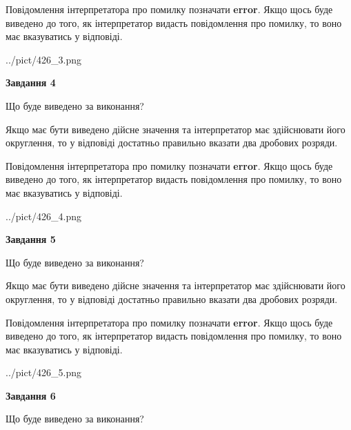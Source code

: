 \documentclass[12pt, ukrainian]{article}
\begin{document}
{\begin {Large}
Повідомлення інтерпретатора про помилку позначати \textbf{error}.
Якщо щось буде виведено до того, як інтерпретатор видасть повідомлення про помилку, 
то воно має вказуватись у відповіді. \par

\begin{center}
	{../pict/426_3.png}
\end{center}
\newpage

{\begin {center}\textbf{Завдання 4}\end {center}}\par
Що буде виведено за виконання? \par

Якщо має бути виведено дійсне значення та інтерпретатор має здійснювати його округлення, 
то у відповіді достатньо правильно вказати два дробових розряди.

Повідомлення інтерпретатора про помилку позначати \textbf{error}.
Якщо щось буде виведено до того, як інтерпретатор видасть повідомлення про помилку, 
то воно має вказуватись у відповіді. \par

\begin{center}
	{../pict/426_4.png}
\end{center}
\newpage

{\begin {center}\textbf{Завдання 5}\end {center}}\par
Що буде виведено за виконання? \par

Якщо має бути виведено дійсне значення та інтерпретатор має здійснювати його округлення, 
то у відповіді достатньо правильно вказати два дробових розряди.

Повідомлення інтерпретатора про помилку позначати \textbf{error}.
Якщо щось буде виведено до того, як інтерпретатор видасть повідомлення про помилку, 
то воно має вказуватись у відповіді. \par

\begin{center}
	{../pict/426_5.png}
\end{center}
\newpage

{\begin {center}\textbf{Завдання 6}\end {center}}\par
Що буде виведено за виконання? \par


\end{Large}}
\end{document}
